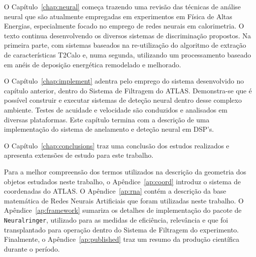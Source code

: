 O Capítulo~\ref{chap:neural} começa trazendo uma revisão das técnicas de
análise neural que são atualmente empregadas em experimentos em Física de
Altas Energias, especialmente focado no emprego de redes neurais em
calorimetria. O texto continua desenvolvendo os diversos sistemas de
discriminação propostos. Na primeira parte, com sistemas baseados na
re-utilização do algoritmo de extração de características T2Calo e, numa
segunda, utilizando um processamento baseado em anéis de deposição energética
remodelado e melhorado.

O Capítulo~\ref{chap:implement} adentra pelo emprego do sistema desenvolvido
no capítulo anterior, dentro do Sistema de Filtragem do ATLAS. Demonstra-se
que é possível construir e executar sistemas de deteção neural dentro desse
complexo ambiente. Testes de acuidade e velocidade são conduzidos e analisados
em diversas plataformas. Este capítulo termina com a descrição de uma
implementação do sistema de anelamento e deteção neural em DSP's.

O Capítulo~\ref{chap:conclusions} traz uma conclusão dos estudos realizados e
apresenta extensões de estudo para este trabalho.

Para a melhor compreensão dos termos utilizados na descrição da geometria dos
objetos estudados neste trabalho, o Apêndice~\ref{ap:coord} introduz o sistema
de coordenadas do ATLAS. O Apêndice~\ref{ap:rna} contém a descrição da base
matemática de Redes Neurais Artificiais que foram utilizadas neste trabalho. O
Apêndice~\ref{ap:framework} sumariza os detalhes de implementação do pacote de
 \texttt{Neuralringer}, utilizado para as medidas de eficiência,
relevância e que foi transplantado para operação dentro do Sistema de
Filtragem do experimento. Finalmente, o Apêndice~\ref{ap:published} traz um
resumo da produção científica durante o período.


